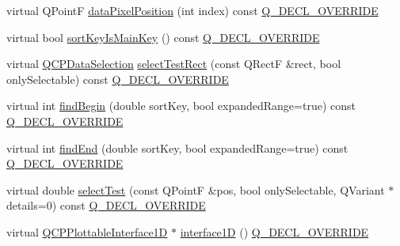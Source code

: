 \begin{DoxyCompactItemize}
\item 
virtual Q\+PointF \hyperlink{class_q_c_p_error_bars_ae79fed6566f1912a97344b20b35faac1}{data\+Pixel\+Position} (int index) const \hyperlink{qcustomplot_8hh_a42cc5eaeb25b85f8b52d2a4b94c56f55}{Q\+\_\+\+D\+E\+C\+L\+\_\+\+O\+V\+E\+R\+R\+I\+DE}
\item 
virtual bool \hyperlink{class_q_c_p_error_bars_af75958b95d9b9c7edfd9851c1d123850}{sort\+Key\+Is\+Main\+Key} () const \hyperlink{qcustomplot_8hh_a42cc5eaeb25b85f8b52d2a4b94c56f55}{Q\+\_\+\+D\+E\+C\+L\+\_\+\+O\+V\+E\+R\+R\+I\+DE}
\item 
virtual \hyperlink{class_q_c_p_data_selection}{Q\+C\+P\+Data\+Selection} \hyperlink{class_q_c_p_error_bars_ad7c727736599dfb173f0952082e1a5b6}{select\+Test\+Rect} (const Q\+RectF \&rect, bool only\+Selectable) const \hyperlink{qcustomplot_8hh_a42cc5eaeb25b85f8b52d2a4b94c56f55}{Q\+\_\+\+D\+E\+C\+L\+\_\+\+O\+V\+E\+R\+R\+I\+DE}
\item 
virtual int \hyperlink{class_q_c_p_error_bars_a74c57d6abb8eda3c4c31b72d1df9f568}{find\+Begin} (double sort\+Key, bool expanded\+Range=true) const \hyperlink{qcustomplot_8hh_a42cc5eaeb25b85f8b52d2a4b94c56f55}{Q\+\_\+\+D\+E\+C\+L\+\_\+\+O\+V\+E\+R\+R\+I\+DE}
\item 
virtual int \hyperlink{class_q_c_p_error_bars_ad22dd8499c6d45176ad0651751a0b0b0}{find\+End} (double sort\+Key, bool expanded\+Range=true) const \hyperlink{qcustomplot_8hh_a42cc5eaeb25b85f8b52d2a4b94c56f55}{Q\+\_\+\+D\+E\+C\+L\+\_\+\+O\+V\+E\+R\+R\+I\+DE}
\item 
virtual double \hyperlink{class_q_c_p_error_bars_ac1b6675ef43e32547a3cbcf7b7ac46ed}{select\+Test} (const Q\+PointF \&pos, bool only\+Selectable, Q\+Variant $\ast$details=0) const \hyperlink{qcustomplot_8hh_a42cc5eaeb25b85f8b52d2a4b94c56f55}{Q\+\_\+\+D\+E\+C\+L\+\_\+\+O\+V\+E\+R\+R\+I\+DE}
\item 
virtual \hyperlink{class_q_c_p_plottable_interface1_d}{Q\+C\+P\+Plottable\+Interface1D} $\ast$ \hyperlink{class_q_c_p_error_bars_a0b6fbf3a943b4241ee485d066cc8562a}{interface1D} () \hyperlink{qcustomplot_8hh_a42cc5eaeb25b85f8b52d2a4b94c56f55}{Q\+\_\+\+D\+E\+C\+L\+\_\+\+O\+V\+E\+R\+R\+I\+DE}
\end{DoxyCompactItemize}
